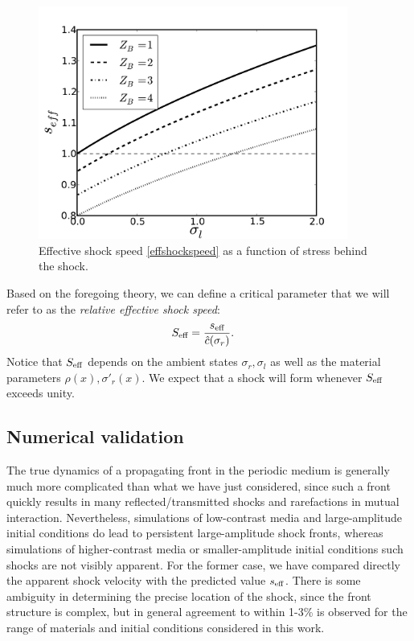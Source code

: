 \begin{figure}
\centerline{\includegraphics[width=4in]{figures/seff.pdf}}
\caption{Effective shock speed \eqref{effshockspeed} as a function of stress behind the shock.\label{fig:cshock}}
\end{figure}

Based on the foregoing theory, we can define a critical parameter that
we will refer to as the {\em relative effective shock speed}:
\begin{align} \label{eq:seff}
S_\textup{eff} & = \frac{s_\textup{eff}}{\hat{c}(\sigma_r)}.
\end{align}
Notice that $S_\textup{eff}$ depends on the ambient states $\sigma_r,\sigma_l$
as well as the material parameters $\rho(x),\sigma'_r(x)$.  We expect that a
shock will form whenever $S_\textup{eff}$ exceeds unity.

\subsection{Numerical validation}
The true dynamics of a propagating front in the periodic medium
is generally much more complicated than what we have just considered,
since such a front quickly results in many reflected/transmitted shocks and
rarefactions in mutual interaction.  Nevertheless, simulations of
low-contrast media and large-amplitude initial conditions do lead to
persistent large-amplitude shock fronts, whereas simulations of 
higher-contrast media or smaller-amplitude initial conditions such
shocks are not visibly apparent.  For the former case, we have compared directly 
the apparent shock velocity with the predicted value $s_\textup{eff}$.
There is some ambiguity in determining the precise location of the shock,
since the front structure is complex, but in general agreement to within
1-3\% is observed for the range of materials and initial conditions considered
in this work.

